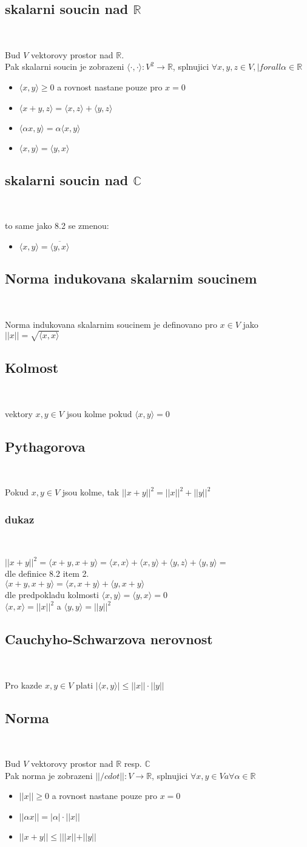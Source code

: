 \documentclass[a4paper]{article}
\newcommand{\definice}[3]{
	\setcounter{section}{#1}
	\setcounter{subsection}{#2}
	\addtocounter{subsection}{-1}
	\subsection{#3}~
}
\newcommand{\veta}[3]{
	\setcounter{section}{#1}
	\setcounter{subsection}{#2}
	\addtocounter{subsection}{-1}
	\subsection{#3}~
}
\newcommand{\dukaz}{
	\subsubsection*{dukaz}~
}
\begin{document}
\definice{8}{2}{skalarni soucin nad $\mathbb{R}$}
Bud $V$ vektorovy prostor nad $\mathbb{R}$.\\
Pak skalarni soucin je zobrazeni $\langle\cdot , \cdot\rangle:V^2 \rightarrow \mathbb{R}$,
splnujici $\forall x, y, z \in V, |forall \alpha \in \mathbb{R}$\\
\begin{itemize}
    \item $\langle x, y\rangle \geq 0$ a rovnost nastane pouze pro $x=0$
    \item $\langle x+y,z\rangle = \langle x,z\rangle + \langle y,z\rangle$
    \item $\langle\alpha x, y\rangle = \alpha\langle x,y\rangle$
    \item $\langle x,y\rangle = \langle y,x\rangle$
\end{itemize}


\definice{8}{3}{skalarni soucin nad $\mathbb{C}$}
to same jako 8.2 se zmenou:\\
\begin{itemize}
    \item $\langle x,y\rangle = \overline{\langle y,x\rangle}$
\end{itemize}


\definice{8}{8}{Norma indukovana skalarnim soucinem}
Norma indukovana skalarnim soucinem je definovano pro
$x\in V$ jako $ ||x|| = \sqrt{\langle x,x\rangle} $

\definice{8}{9}{Kolmost}
vektory $x,y \in V$ jsou kolme pokud $\langle x, y \rangle = 0$


\veta{8}{11}{Pythagorova}
Pokud $x,y \in V$ jsou kolme, tak $||x+y||^2 = ||x||^2+||y||^2$

\dukaz
$||x+y||^2=\langle x+y, x+y\rangle=\langle x,x\rangle+\langle x,y\rangle+\langle y,z\rangle+\langle y,y\rangle=$\\
dle definice 8.2 item 2.\\
$\langle x+y, x+y\rangle=\langle x,x+y\rangle+\langle y,x+y\rangle$\\
dle predpokladu kolmosti $\langle x,y\rangle = \langle y,x\rangle = 0$\\
$\langle x,x\rangle = ||x||^2$ a $\langle y,y\rangle = ||y||^2$


\veta{8}{13}{Cauchyho-Schwarzova nerovnost}
Pro kazde $x,y \in V$ plati $|\langle x,y\rangle| \leq ||x||\cdot||y||$


\definice{8}{15}{Norma}
Bud $V$ vektorovy prostor nad $\mathbb{R}$ resp. $\mathbb{C}$\\
Pak norma je zobrazeni $||/cdot|| : V \rightarrow \mathbb{R}$,
splnujici $\forall x, y \in V a \forall \alpha \in \mathbb{R}$\\
\begin{itemize}
    \item $||x|| \geq 0$ a rovnost nastane pouze pro $x=0$
    \item $||\alpha x || = |\alpha|\cdot ||x||$
    \item $||x+y|| \leq |||x|| + ||y||$
\end{itemize}
\end{document}
